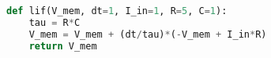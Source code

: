\begin{lstlisting}[language=Python, caption={Implementação em Python do potencial de ação decrescente de um LIF: $I_{in}=1$}, label={lst:membranepotentialincrease}]
	
def lif(V_mem, dt=1, I_in=1, R=5, C=1):
	tau = R*C
	V_mem = V_mem + (dt/tau)*(-V_mem + I_in*R)
	return V_mem
\end{lstlisting}